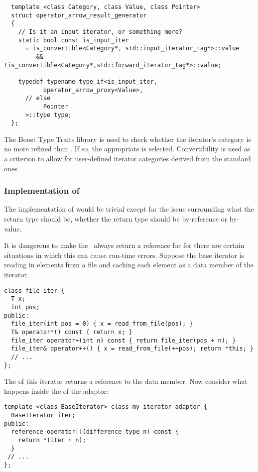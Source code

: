 \documentclass{netobjectdays}
\newcommand{\iteratoradaptor}{\code{iterator\_\-adaptor}}
\begin{document}
{\footnotesize
\begin{verbatim}
  template <class Category, class Value, class Pointer>
  struct operator_arrow_result_generator
  {
    // Is it an input iterator, or something more?
    static bool const is_input_iter
      = is_convertible<Category*, std::input_iterator_tag*>::value
         && !is_convertible<Category*,std::forward_iterator_tag*>::value;

    typedef typename type_if<is_input_iter,
           operator_arrow_proxy<Value>,
      // else
           Pointer
      >::type type;
  };
\end{verbatim}
}

The Boost Type Traits library is used to check whether the iterator's
category is no more refined than . If so,
the appropriate  is selected.
Convertibility is used as a criterion to allow for user-defined
iterator categories derived from the standard ones.


\subsubsection{Implementation of }
\label{sec:op-bracket-impl}

The implementation of  would be trivial except for
the issue surrounding what the return type should be, whether the
return type should be by-reference or by-value.

It is dangerous to make the \iteratoradaptor\ always return a
reference for  for there are certain situations in
which this can cause run-time errors.  Suppose the base iterator is
reading in elements from a file and caching each element as a data
member of the iterator.

{\footnotesize
\begin{verbatim}
class file_iter {
  T x;
  int pos;
public:
  file_iter(int pos = 0) { x = read_from_file(pos); }
  T& operator*() const { return x; }
  file_iter operator+(int n) const { return file_iter(pos + n); }
  file_iter& operator++() { x = read_from_file(++pos); return *this; }
  // ...
};
\end{verbatim}
}

\noindent The  of this iterator returns a reference to
the data member. Now consider what happens inside the
 of the adaptor:

{\footnotesize
\begin{verbatim}
template <class BaseIterator> class my_iterator_adaptor {
  BaseIterator iter;
public:
  reference operator[](difference_type n) const {
    return *(iter + n);
  }
 // ...
};
\end{verbatim}
}
\end{document}
